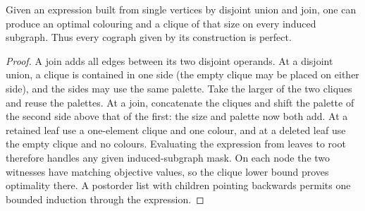 \begin{proposition}\leavevmode\label{co:cographs}
Given an expression built from single vertices by disjoint union and join,
one can produce an optimal colouring and a clique of that size on every
induced subgraph. Thus every cograph given by its construction is perfect.
\end{proposition}
\begin{proof}
A join adds all edges between its two disjoint operands. At a disjoint union,
a clique is contained in one side (the empty clique may be placed on either
side), and the sides may use the same palette. Take the larger of the two
cliques and reuse the palettes. At a join, concatenate the cliques and shift
the palette of the second side above that of the first: the size and palette
now both add. At a retained leaf use a one-element clique and one colour,
and at a deleted leaf use the empty clique and no colours. Evaluating the
expression from leaves to root therefore handles any given induced-subgraph
mask. On each node the two witnesses have matching objective values, so the
clique lower bound proves optimality there. A postorder list with children
pointing backwards permits one bounded induction through the expression.
\end{proof}

